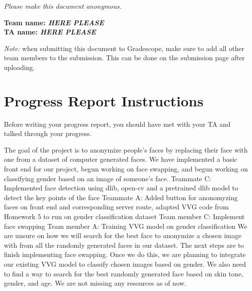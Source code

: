 \emph{Please make this document anonymous.}

\textbf{Team name: \emph{HERE PLEASE}}\\
\textbf{TA name: \emph{HERE PLEASE}}

\emph{Note:} when submitting this document to Gradescope, make sure to add all other team members to the submission. This can be done on the submission page after uploading.

\section*{Progress Report Instructions}

Before writing your progress report, you should have met with your TA and talked through your progress.

%
The goal of the project is to anonymize people's faces by replacing their face with one from a dataset of computer generated faces.
% 
We have implemented a basic front end for our project, begun working on face swapping, and begun working on classifying gender based on an image of someone's face.
%
Teammate C: Implemented face detection using dlib, open-cv and a pretrained dlib model to detect the key points of the face
Teammate A: Added button for anonomyzing faces on front end and corresponding server route, adapted VVG code from Homework 5 to run on gender classification dataset
% 
Team member C: Implement face swapping 
Team member A: Training VVG model on gender classification
%
We are unsure on how we will search for the best face to anonymize a chosen image with from all the randomly generated faces in our dataset. 
%
The next steps are to finish implementing face swapping. Once we do this, we are planning to integrate our existing VVG model to classify chosen images based on gender. We also need to find a way to search for the best randomly generated face based on skin tone, gender, and age. 
%
We are not missing any resources as of now. 


